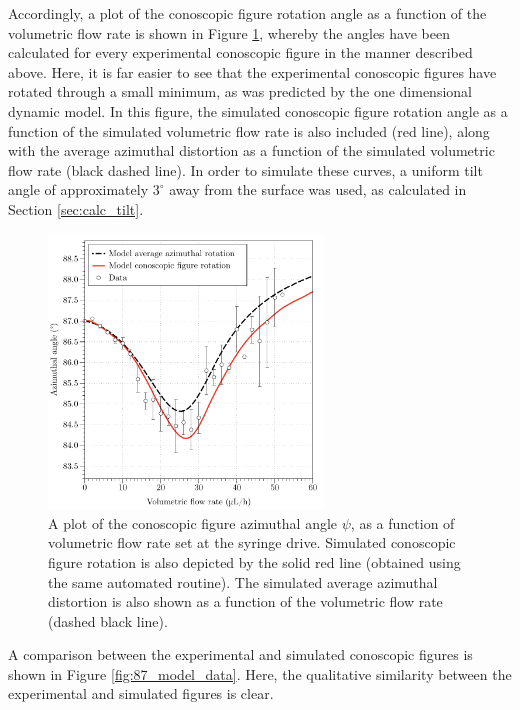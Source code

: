 Accordingly, a plot of the conoscopic figure rotation angle as a function of the volumetric flow rate is shown in Figure \ref{fig:uniform_data_plot}, whereby the angles have been calculated for every experimental conoscopic figure in the manner described above. Here, it is far easier to see that the experimental conoscopic figures have rotated through a small minimum, as was predicted by the one dimensional dynamic model. In this figure, the simulated conoscopic figure rotation angle as a function of the simulated volumetric flow rate is also included (red line), along with the average azimuthal distortion as a function of the simulated volumetric flow rate (black dashed line). In order to simulate these curves, a uniform tilt angle of approximately $3^{\circ}$ away from the surface was used, as calculated in Section \ref{sec:calc_tilt}.

\begin{figure}
\begin{center}
\includegraphics[width=0.65\textwidth]{Figures/90/uniform_data_plot}
\end{center}
\caption[Plot of experimental conoscopic figure rotation as a function of flow rate]{\label{fig:uniform_data_plot}A plot of the conoscopic figure azimuthal angle $\psi$, as a function of volumetric flow rate set at the syringe drive. Simulated conoscopic figure rotation is also depicted by the solid red line (obtained using the same automated routine). The simulated average azimuthal distortion is also shown as a function of the volumetric flow rate (dashed black line).}
\end{figure}

A comparison between the experimental and simulated conoscopic figures is shown in Figure \ref{fig:87_model_data}. Here, the qualitative similarity between the experimental and simulated figures is clear.

